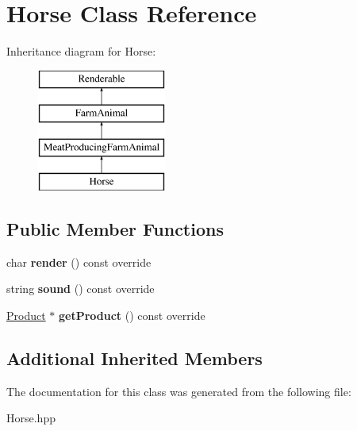 \hypertarget{class_horse}{}\section{Horse Class Reference}
\label{class_horse}
Inheritance diagram for Horse\+:\begin{figure}[H]
\begin{center}
\leavevmode
\includegraphics[height=4.000000cm]{class_horse}
\end{center}
\end{figure}
\subsection*{Public Member Functions}
\begin{DoxyCompactItemize}
\item 
\mbox{\label{class_horse_aa0d9cc201fa63963321caf542d5f5cc5}} 
char {\bfseries render} () const override
\item 
\mbox{\label{class_horse_a734d7fc161f5b44481ad43f58adf0fc4}} 
string {\bfseries sound} () const override
\item 
\mbox{\label{class_horse_a9a4fad1cdab754ab66fc869da141d623}} 
\mbox{\hyperlink{class_product}{Product}} $\ast$ {\bfseries get\+Product} () const override
\end{DoxyCompactItemize}
\subsection*{Additional Inherited Members}


The documentation for this class was generated from the following file\+:\begin{DoxyCompactItemize}
\item 
Horse.\+hpp\end{DoxyCompactItemize}
